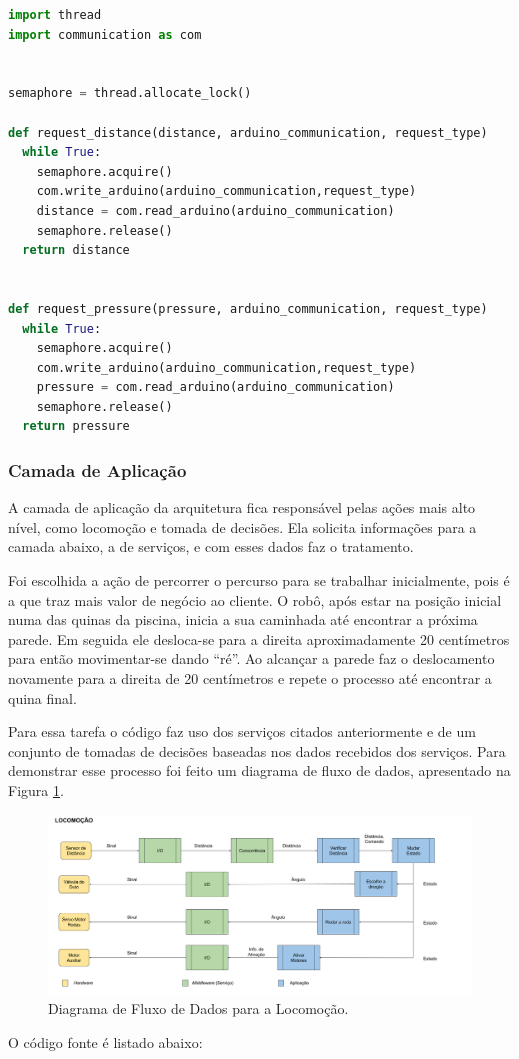 \begin{lstlisting}[language=Python, label=services, caption=Código da Camada de Serviços - Serviço de Concorrência]
import thread
import communication as com


semaphore = thread.allocate_lock()

def request_distance(distance, arduino_communication, request_type)
  while True:
    semaphore.acquire()
    com.write_arduino(arduino_communication,request_type)
    distance = com.read_arduino(arduino_communication)
    semaphore.release()
  return distance


def request_pressure(pressure, arduino_communication, request_type)
  while True:
    semaphore.acquire()
    com.write_arduino(arduino_communication,request_type)
    pressure = com.read_arduino(arduino_communication)
    semaphore.release()
  return pressure
\end{lstlisting}

\subsubsection{Camada de Aplicação}
A camada de aplicação da arquitetura fica responsável pelas ações mais alto nível, como locomoção e tomada de decisões. Ela solicita informações para a camada abaixo, a de serviços, e com esses dados faz o tratamento.

Foi escolhida a ação de percorrer o percurso para se trabalhar inicialmente, pois é a que traz mais valor de negócio ao cliente. O robô, após estar na posição inicial numa das quinas da piscina, inicia a sua caminhada até encontrar a próxima parede. Em seguida ele desloca-se para a direita aproximadamente 20 centímetros para então movimentar-se dando “ré”. Ao alcançar a parede faz o deslocamento novamente para a direita de 20 centímetros e repete o processo até encontrar a quina final.

Para essa tarefa o código faz uso dos serviços citados anteriormente e de um conjunto de tomadas de decisões baseadas nos dados recebidos dos serviços. Para demonstrar esse processo foi feito um diagrama de fluxo de dados, apresentado na Figura \ref{fig:move-dfd}.
\par
\begin{figure}[h]
  \centering
  \includegraphics[width=\textwidth]{figures/move-dfd.png}
  \caption{Diagrama de Fluxo de Dados para a Locomoção.}
  \label{fig:move-dfd}
\end{figure}
\FloatBarrier
\par
O código fonte é listado abaixo:

